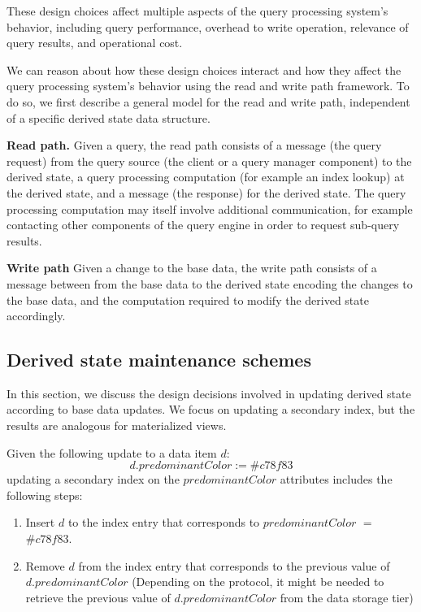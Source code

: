 These design choices affect multiple aspects of the query processing system's behavior,
including query performance, overhead to write operation, relevance of query results, and operational cost.

We can reason about how these design choices interact and how they affect the query processing system's behavior
using the read and write path framework.
To do so, we first describe a general model for the read and write path,
independent of a specific derived state data structure.

\textbf{Read path.}
Given a query, the read path consists of a message (the query request) from the query source (the client or a query manager component)
to the derived state, a query processing computation (for example an index lookup) at the derived state,
and a message (the response) for the derived state.
The query processing computation may itself involve additional communication, for example contacting other components of
the query engine in order to request sub-query results.

\textbf{Write path}
Given a change to the base data,
the write path consists of a message between from the base data to the derived state encoding the changes to the base data,
and the computation required to modify the derived state accordingly.



\subsection{Derived state maintenance schemes}
\label{sec:sync_async_maintenance}

In this section,
we discuss the design decisions involved in updating derived state according to base data updates.
We focus on updating a secondary index,
but the results are analogous for materialized views.

Given the following update to a data item $d$:
\[
d.predominantColor := \#c78f83
\]
updating a secondary index on the $predominantColor$ attributes includes the following steps:
\begin{enumerate}
  \item Insert $d$ to the index entry that corresponds to $predominantColor$ $=$ $\#c78f83$.
  \item Remove $d$ from the index entry that corresponds to the previous value of $d.predominantColor$
  (Depending on the protocol, it might be needed to retrieve the previous value of $d.predominantColor$ from the data storage
  tier)
\end{enumerate}

